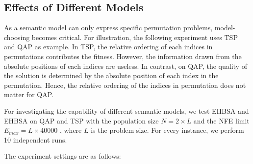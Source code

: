 \subsection{Effects of Different Models}
As a semantic model can only express specific permutation problems, model-choosing becomes critical. For illustration, the following experiment uses TSP and QAP as example. In TSP, the relative ordering of each indices in permutations contributes the fitness. However, the information drawn from the absolute positions of each indices are useless. In contrast, on QAP, the quality of the solution is determined by the absolute position of each index in the permutation. Hence, the relative ordering of the indices in permutation does not matter for QAP.


  For investigating the capability of different semantic models, we test EHBSA and EHBSA on QAP and TSP with the population size $N = 2 \times L$ and the NFE limit $E_{max} = L \times 40000$ , where $L$ is the problem size. For every instance, we perform 10 independent runs.

 The experiment settings are as follows: 
\begin{itemize}
\end{itemize}

